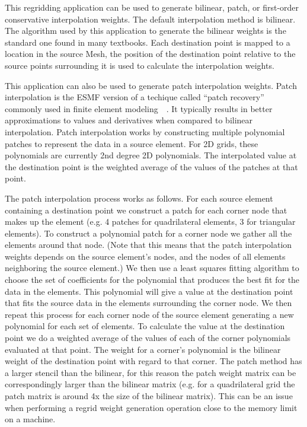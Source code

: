  This regridding application can be used to generate bilinear, patch, or first-order conservative interpolation weights. The default interpolation method
is bilinear. The algorithm used by this application to generate the bilinear weights is the standard one found in
many textbooks.  Each destination point is mapped to a location in the source Mesh, the position of the destination point relative 
to the source points surrounding it is used to calculate the interpolation weights. 

 This application can also be used to generate patch interpolation weights. Patch
interpolation is the ESMF version of a techique called ``patch recovery'' commonly
used in finite element modeling~\cite{PatchInterp1}~\cite{PatchInterp2}. It typically results in better approximations to values and derivatives when compared to bilinear interpolation.  
Patch interpolation works by constructing multiple polynomial patches to represent
the data in a source element. For 2D grids, these polynomials 
are currently 2nd degree 2D polynomials. The interpolated value at the destination point 
is the weighted average of the values of the patches at that point. 

The patch interpolation process works as follows. 
For each source element containing a destination point
we construct a patch for each corner node that makes up the element (e.g. 4 patches for 
quadrilateral elements, 3 for triangular elements). To construct a polynomial patch for
 a corner node we gather all the elements around that node. 
(Note that this means that the patch interpolation weights depends on the source 
element's nodes, and the nodes of all elements neighboring the source element.)  
We then use a least squares fitting algorithm to choose the set of coefficients 
for the polynomial that produces the best fit for the data in the elements. 
This polynomial will give a value at the destination point that fits the source data 
in the elements surrounding the corner node. We then repeat this process for each 
corner node of the source element generating a new polynomial for each set of elements.  
To calculate the value at the destination point we do a weighted average of the values 
of each of the corner polynomials evaluated at that point. The weight for a corner's 
polynomial is the bilinear weight of the destination point with regard to that corner.  
The patch method has a larger stencil than the bilinear, for this reason the patch weight matrix can be correspondingly larger
than the bilinear matrix (e.g. for a quadrilateral grid the patch matrix is around 4x the size of
the bilinear matrix). This can be an issue when performing a regrid weight generation operation close to the memory
limit on a machine. 



